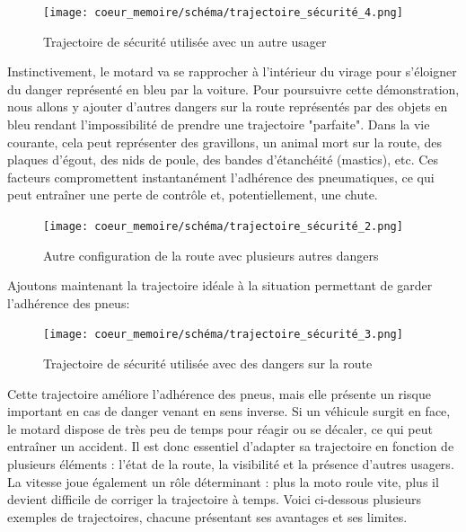 \begin{figure}[H]
    \centering
    \texttt{[image: coeur\_memoire/schéma/trajectoire\_sécurité\_4.png]} 
    \caption{Trajectoire de sécurité utilisée avec un autre usager}
\end{figure}
Instinctivement, le motard va se rapprocher à l'intérieur du virage pour s'éloigner du danger représenté en bleu par la voiture.
Pour poursuivre cette démonstration, nous allons y ajouter d'autres dangers sur la route représentés par des objets en bleu rendant l'impossibilité de prendre une trajectoire "parfaite". Dans la vie courante, cela peut représenter des gravillons, un animal mort sur la route, des plaques d'égout, des nids de poule, des bandes d'étanchéité (mastics), etc. Ces facteurs compromettent instantanément l’adhérence des pneumatiques, ce qui peut entraîner une perte de contrôle et, potentiellement, une chute.
\begin{figure}[H]
    \centering
    \texttt{[image: coeur\_memoire/schéma/trajectoire\_sécurité\_2.png]} 
    \caption{Autre configuration de la route avec plusieurs autres dangers}
\end{figure}
Ajoutons maintenant la trajectoire idéale à la situation permettant de garder l'adhérence des pneus:
\begin{figure}[H]
    \centering
    \texttt{[image: coeur\_memoire/schéma/trajectoire\_sécurité\_3.png]} 
    \caption{Trajectoire de sécurité utilisée avec des dangers sur la route}
    \label{fig:trajectoire_securite_difficulte}
\end{figure}
Cette trajectoire améliore l’adhérence des pneus, mais elle présente un risque important en cas de danger venant en sens inverse. Si un véhicule surgit en face, le motard dispose de très peu de temps pour réagir ou se décaler, ce qui peut entraîner un accident. Il est donc essentiel d’adapter sa trajectoire en fonction de plusieurs éléments : l’état de la route, la visibilité et la présence d’autres usagers. La vitesse joue également un rôle déterminant : plus la moto roule vite, plus il devient difficile de corriger la trajectoire à temps. Voici ci-dessous plusieurs exemples de trajectoires, chacune présentant ses avantages et ses limites.
